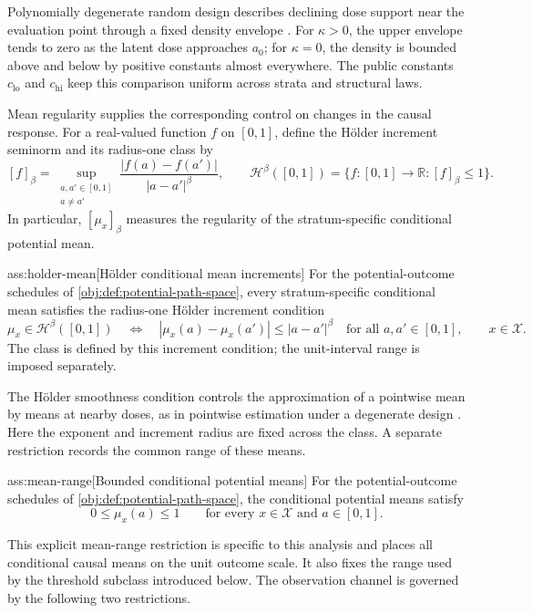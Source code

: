 \documentclass[11pt]{article}
\begin{document}
Polynomially degenerate random design describes declining dose support near the evaluation point through a fixed density envelope \citep{Gaiffas2005}. For \(\kappa>0\), the upper envelope tends to zero as the latent dose approaches \(a_0\); for \(\kappa=0\), the density is bounded above and below by positive constants almost everywhere. The public constants \(c_{\mathrm{lo}}\) and \(c_{\mathrm{hi}}\) keep this comparison uniform across strata and structural laws.

Mean regularity supplies the corresponding control on changes in the causal response. For a real-valued function \(f\) on \([0,1]\), define the Hölder increment seminorm and its radius-one class by
\[
[f]_\beta
=
\sup_{\substack{a,a'\in[0,1]\\a\ne a'}}
\frac{|f(a)-f(a')|}{|a-a'|^\beta},
\qquad
\mathcal H^\beta([0,1])
=
\{f:[0,1]\to\mathbb R:[f]_\beta\le1\}.
\]
In particular, \([\mu_x]_\beta\) measures the regularity of the stratum-specific conditional potential mean.

\begin{assumptionv}{ass:holder-mean}[Hölder conditional mean increments]
For the potential-outcome schedules of \cref{obj:def:potential-path-space}, every stratum-specific conditional mean satisfies the radius-one Hölder increment condition
\[
\mu_x\in\mathcal H^\beta([0,1])
\quad\Longleftrightarrow\quad
|\mu_x(a)-\mu_x(a')|\le |a-a'|^\beta
\quad\text{for all }a,a'\in[0,1],
\qquad x\in\mathcal X.
\]
The class is defined by this increment condition; the unit-interval range is imposed separately.
\end{assumptionv}

The Hölder smoothness condition controls the approximation of a pointwise mean by means at nearby doses, as in pointwise estimation under a degenerate design \citep{Gaiffas2005}. Here the exponent and increment radius are fixed across the class. A separate restriction records the common range of these means.

\begin{assumptionv}{ass:mean-range}[Bounded conditional potential means]
For the potential-outcome schedules of \cref{obj:def:potential-path-space}, the conditional potential means satisfy
\[
0\le\mu_x(a)\le1
\qquad\text{for every }x\in\mathcal X
\text{ and }a\in[0,1].
\]
\end{assumptionv}

This explicit mean-range restriction is specific to this analysis and places all conditional causal means on the unit outcome scale. It also fixes the range used by the threshold subclass introduced below. The observation channel is governed by the following two restrictions.
\end{document}
